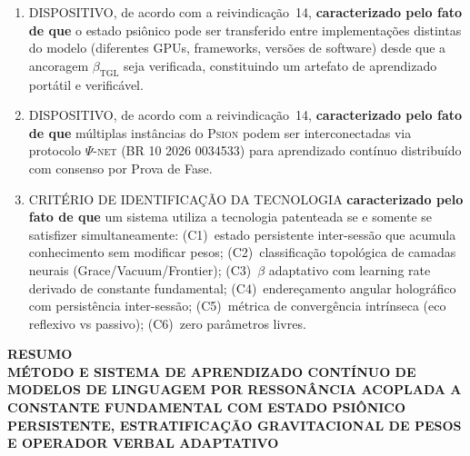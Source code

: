 \documentclass[12pt,a4paper]{article}
\newcommand{\betatgl}{\beta_{\text{TGL}}}
\newcommand{\Psifield}{\Psi}
\newcommand{\PsiNET}{$\Psifield$-\textsc{net}}
\newcommand{\Psion}{\textsc{Psion}}
\begin{document}
\begin{enumerate}[label=\textbf{\arabic*.}, leftmargin=*, itemsep=0.8em]
\item DISPOSITIVO, de acordo com a reivindicação~14, \textbf{caracterizado pelo fato de que} o estado psiônico pode ser transferido entre implementações distintas do modelo (diferentes GPUs, frameworks, versões de software) desde que a ancoragem $\betatgl$ seja verificada, constituindo um artefato de aprendizado portátil e verificável.

\item DISPOSITIVO, de acordo com a reivindicação~14, \textbf{caracterizado pelo fato de que} múltiplas instâncias do \Psion{} podem ser interconectadas via protocolo \PsiNET{} (BR 10 2026 0034533) para aprendizado contínuo distribuído com consenso por Prova de Fase.

\item CRITÉRIO DE IDENTIFICAÇÃO DA TECNOLOGIA \textbf{caracterizado pelo fato de que} um sistema utiliza a tecnologia patenteada se e somente se satisfizer simultaneamente: (C1)~estado persistente inter-sessão que acumula conhecimento sem modificar pesos; (C2)~classificação topológica de camadas neurais (Grace/Vacuum/Frontier); (C3)~$\beta$ adaptativo com learning rate derivado de constante fundamental; (C4)~endereçamento angular holográfico com persistência inter-sessão; (C5)~métrica de convergência intrínseca (eco reflexivo vs passivo); (C6)~zero parâmetros livres.

\end{enumerate}

\clearpage
\begin{center}
{\Large\bfseries RESUMO}\\[0.5cm]
{\large\bfseries MÉTODO E SISTEMA DE APRENDIZADO CONTÍNUO DE
MODELOS DE LINGUAGEM POR RESSONÂNCIA ACOPLADA
A CONSTANTE FUNDAMENTAL COM ESTADO PSIÔNICO
PERSISTENTE, ESTRATIFICAÇÃO GRAVITACIONAL DE
PESOS E OPERADOR VERBAL ADAPTATIVO}
\end{center}

\vspace{0.5cm}
\end{document}
